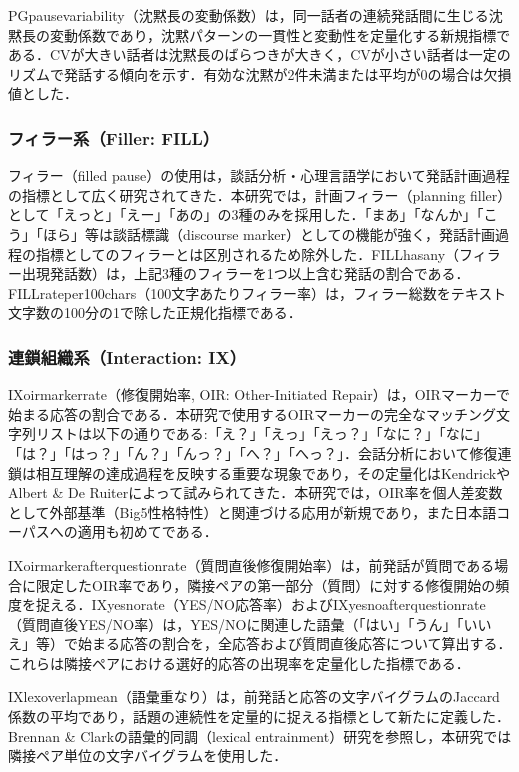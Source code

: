 \documentclass[dvipdfmx,11pt,a4paper]{bxjsarticle}
\renewcommand{\_}{\paperorigunderscore\allowbreak}%
\begin{document}
PG\_pause\_variability（沈黙長の変動係数）は，同一話者の連続発話間に生じる沈黙長の変動係数であり，沈黙パターンの一貫性と変動性を定量化する新規指標である．CVが大きい話者は沈黙長のばらつきが大きく，CVが小さい話者は一定のリズムで発話する傾向を示す．有効な沈黙が2件未満または平均が0の場合は欠損値とした．

\subsubsection{フィラー系（Filler: FILL）}
フィラー（filled pause）の使用は，談話分析・心理言語学において発話計画過程の指標として広く研究されてきた\cite{clark1996,watanabe2003}．本研究では，計画フィラー（planning filler）として「えっと」「えー」「あの」の3種のみを採用した．「まあ」「なんか」「こう」「ほら」等は談話標識（discourse marker）としての機能が強く，発話計画過程の指標としてのフィラーとは区別されるため除外した\cite{watanabe2003}．FILL\_has\_any（フィラー出現発話数）は，上記3種のフィラーを1つ以上含む発話の割合である．FILL\_rate\_per\_100chars（100文字あたりフィラー率）は，フィラー総数をテキスト文字数の100分の1で除した正規化指標である．

\subsubsection{連鎖組織系（Interaction: IX）}
IX\_oirmarker\_rate（修復開始率, OIR: Other-Initiated Repair）は，OIRマーカーで始まる応答の割合である．本研究で使用するOIRマーカーの完全なマッチング文字列リストは以下の通りである:「え？」「えっ」「えっ？」「なに？」「なに」「は？」「はっ？」「ん？」「んっ？」「へ？」「へっ？」．会話分析において修復連鎖は相互理解の達成過程を反映する重要な現象であり\cite{schegloff1977}，その定量化はKendrick\cite{kendrick2015}やAlbert \& De Ruiter\cite{albert2018}によって試みられてきた．本研究では，OIR率を個人差変数として外部基準（Big5性格特性）と関連づける応用が新規であり，また日本語コーパスへの適用も初めてである．

IX\_oirmarker\_after\_question\_rate（質問直後修復開始率）は，前発話が質問である場合に限定したOIR率であり，隣接ペアの第一部分（質問）に対する修復開始の頻度を捉える．IX\_yesno\_rate（YES/NO応答率）およびIX\_yesno\_after\_question\_rate（質問直後YES/NO率）は，YES/NOに関連した語彙（「はい」「うん」「いいえ」等）で始まる応答の割合を，全応答および質問直後応答について算出する．これらは隣接ペアにおける選好的応答の出現率を定量化した指標である．

IX\_lex\_overlap\_mean（語彙重なり）は，前発話と応答の文字バイグラムのJaccard係数の平均であり，話題の連続性を定量的に捉える指標として新たに定義した．Brennan \& Clark\cite{brennan1996}の語彙的同調（lexical entrainment）研究を参照し，本研究では隣接ペア単位の文字バイグラムを使用した．
\end{document}
